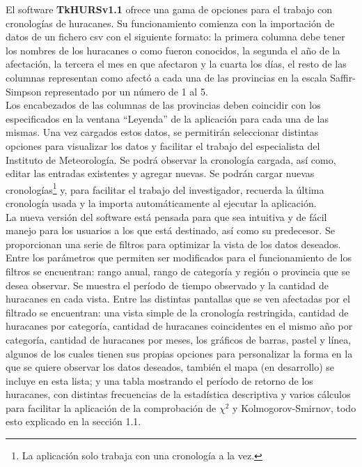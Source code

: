 El software \textbf{TkHURSv1.1} ofrece una gama de opciones para el trabajo con cronologías de huracanes. Su funcionamiento comienza con la importación de datos de un fichero csv con el siguiente formato: la primera columna debe tener los nombres de los huracanes o como fueron conocidos, la segunda el año de la afectación, la tercera el mes en que afectaron y la cuarta los días, el resto de las columnas representan como afectó a cada una de las provincias en la escala Saffir-Simpson representado por un número de 1 al 5.\\


Los encabezados de las columnas de las provincias deben coincidir con los especificados en la ventana “Leyenda” de la aplicación para cada una de las mismas. Una vez cargados estos datos, se permitirán seleccionar distintas opciones para visualizar los datos y facilitar el trabajo del especialista del Instituto de Meteorología. Se podrá observar la cronología cargada, así como, editar las entradas existentes y agregar nuevas. Se podrán cargar nuevas cronologías\footnote{La aplicación solo trabaja con una cronología a la vez.} y, para facilitar el trabajo del investigador, recuerda la última cronología usada y la importa automáticamente al ejecutar la aplicación.\\


La nueva versión del software está pensada para que sea intuitiva y de fácil manejo para los usuarios a los que está destinado, así como su predecesor. Se proporcionan una serie de filtros para optimizar la vista de los datos deseados. Entre los parámetros que permiten ser modificados para el funcionamiento de los filtros se encuentran: rango anual, rango de categoría y región o provincia que se desea observar.
Se muestra el período de tiempo observado y la cantidad de huracanes en cada vista. Entre las distintas pantallas que se ven afectadas por el filtrado se encuentran: una vista simple de la cronología restringida, cantidad de huracanes por categoría, cantidad de huracanes coincidentes en el mismo año por categoría, cantidad de huracanes por meses, los gráficos de barras, pastel y línea, algunos de los cuales tienen sus propias opciones para personalizar la forma en la que se quiere observar los datos deseados, también el mapa (en desarrollo) se incluye en esta lista; y una tabla mostrando el período de retorno de los huracanes, con distintas frecuencias de la estadística descriptiva y varios cálculos para facilitar la aplicación de la comprobación de $\chi^{2}$ y Kolmogorov-Smirnov, todo esto explicado en la sección 1.1.\\

